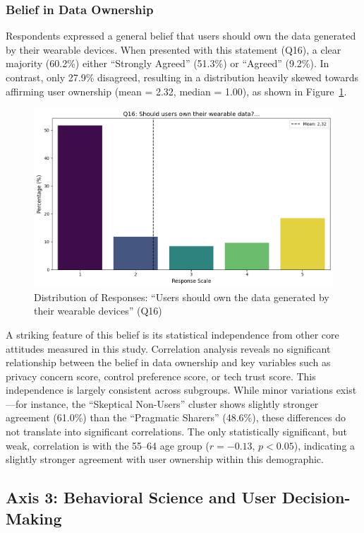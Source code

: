 	\subsubsection{Belief in Data Ownership}
		Respondents expressed a general belief that users should own the data generated by their wearable devices. When presented with this statement (Q16), a clear majority (60.2\%) either ``Strongly Agreed'' (51.3\%) or ``Agreed'' (9.2\%). In contrast, only 27.9\% disagreed, resulting in a distribution heavily skewed towards affirming user ownership (mean = 2.32, median = 1.00), as shown in Figure~\ref{fig:Q16_data_ownership}.
		\begin{figure}[ht]\centering
			\includegraphics[width=0.7\linewidth]{figures/questions/Q16_likert.png}
			\caption{Distribution of Responses: ``Users should own the data generated by their wearable devices'' (Q16)}
			\label{fig:Q16_data_ownership}
		\end{figure}
		A striking feature of this belief is its statistical independence from other core attitudes measured in this study. Correlation analysis reveals no significant relationship between the belief in data ownership and key variables such as privacy concern score, control preference score, or tech trust score. This independence is largely consistent across subgroups. While minor variations exist—for instance, the ``Skeptical Non-Users'' cluster shows slightly stronger agreement (61.0\%) than the ``Pragmatic Sharers'' (48.6\%), these differences do not translate into significant correlations. The only statistically significant, but weak, correlation is with the 55--64 age group ($r = -0.13$, $p < 0.05$), indicating a slightly stronger agreement with user ownership within this demographic.
\subsection{Axis 3: Behavioral Science and User Decision-Making}
